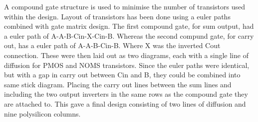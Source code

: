 


A compound gate structure is used to minimise the number of transistors used within the design. 
Layout of transistors has been done using a euler paths combined with gate matrix design.
The first compound gate, for sum output, had a euler path of A-A-B-Cin-X-Cin-B. Whereas the second compund gate, for carry out, has a euler path of A-A-B-Cin-B. Where X was the inverted Cout connection.
These were then laid out as two diagrams, each with a single line of diffusion for PMOS and NOMS transistors.
Since the euler paths were identical, but with a gap in carry out between Cin and B, they could be combined into same stick diagram. 
Placing the carry out lines between the sum lines and including the two output inverters in the same rows as the compound gate they are attached to.
This gave a final design consisting of two lines of diffusion and nine polysilicon columns. 


